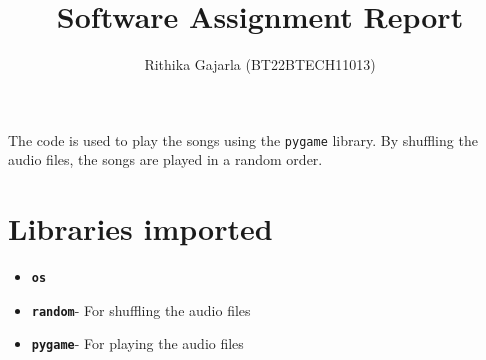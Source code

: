 \documentclass{article}
\begin{document}
\title{Software Assignment Report}
\author{Rithika Gajarla (BT22BTECH11013)}

\maketitle

The code is used to play the songs using the \texttt{pygame} library. By shuffling the audio files, the songs are played in a random order.
\section{Libraries imported}
\begin{itemize}\item \textbf{\texttt{os}}\end{itemize}
\begin{itemize}\item \textbf{\texttt{random}}- For shuffling the audio files\end{itemize}
\begin{itemize}\item \textbf{\texttt{pygame}}- For playing the audio files\end{itemize}
  
\end{document}
